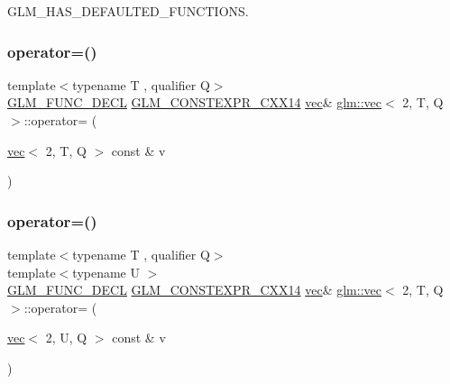 G\+L\+M\+\_\+\+H\+A\+S\+\_\+\+D\+E\+F\+A\+U\+L\+T\+E\+D\+\_\+\+F\+U\+N\+C\+T\+I\+O\+NS. 

\mbox{\label{structglm_1_1vec_3_012_00_01_t_00_01_q_01_4_a1cdeb98b13f93223e04b171b4f5b7d0c}} 
\subsubsection{\texorpdfstring{operator=()}{operator=()}\hspace{0.1cm}{\footnotesize\ttfamily [2/3]}}
{\footnotesize\ttfamily template$<$typename T , qualifier Q$>$ \\
\hyperlink{setup_8hpp_ab2d052de21a70539923e9bcbf6e83a51}{G\+L\+M\+\_\+\+F\+U\+N\+C\+\_\+\+D\+E\+CL} \hyperlink{setup_8hpp_a4dd12abf5e1164bc57f3a34671d03844}{G\+L\+M\+\_\+\+C\+O\+N\+S\+T\+E\+X\+P\+R\+\_\+\+C\+X\+X14} \hyperlink{structglm_1_1vec}{vec}\& \hyperlink{structglm_1_1vec}{glm\+::vec}$<$ 2, T, Q $>$\+::operator= (\begin{DoxyParamCaption}\item[{\hyperlink{structglm_1_1vec}{vec}$<$ 2, T, Q $>$ const \&}]{v }\end{DoxyParamCaption})}

\mbox{\label{structglm_1_1vec_3_012_00_01_t_00_01_q_01_4_a816f1cde5e8bbb6425dd5a93b8579763}} 
\subsubsection{\texorpdfstring{operator=()}{operator=()}\hspace{0.1cm}{\footnotesize\ttfamily [3/3]}}
{\footnotesize\ttfamily template$<$typename T , qualifier Q$>$ \\
template$<$typename U $>$ \\
\hyperlink{setup_8hpp_ab2d052de21a70539923e9bcbf6e83a51}{G\+L\+M\+\_\+\+F\+U\+N\+C\+\_\+\+D\+E\+CL} \hyperlink{setup_8hpp_a4dd12abf5e1164bc57f3a34671d03844}{G\+L\+M\+\_\+\+C\+O\+N\+S\+T\+E\+X\+P\+R\+\_\+\+C\+X\+X14} \hyperlink{structglm_1_1vec}{vec}\& \hyperlink{structglm_1_1vec}{glm\+::vec}$<$ 2, T, Q $>$\+::operator= (\begin{DoxyParamCaption}\item[{\hyperlink{structglm_1_1vec}{vec}$<$ 2, U, Q $>$ const \&}]{v }\end{DoxyParamCaption})}


